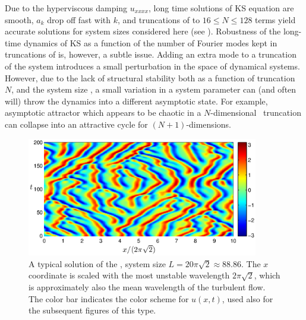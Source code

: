 Due to the hyperviscous damping $u_{xxxx}$, long time solutions of KS
equation are smooth, $a_k$ drop off fast
with $k$, and truncations of  to $16 \leq N \leq 128$
terms yield accurate solutions for system sizes considered here (see
).  Robustness of the long-time dynamics
of KS as a function of the number of Fourier modes kept in truncations
of  is, however, a subtle issue.  Adding an extra mode to
a truncation of the system introduces a small perturbation in the
space of dynamical systems.  However, due to the lack of structural
stability both as a function of truncation $N$, and the system size
, a small variation in a system parameter can (and often will)
throw the dynamics into a different asymptotic state.  For example,
asymptotic attractor which appears to be chaotic in a $N$-dimensional
\statesp\ truncation can collapse into an attractive cycle
for $(N\!+\!1)$-dimensions.

\begin{figure}[t]
\begin{center}
\includegraphics[width=0.9\textwidth]{figs/ks_largeL_cbar_200.eps} %
\end{center}
\caption{
A typical  solution of the \KSe, system size
$L=20\pi\sqrt{2}\approx 88.86$.  The $x$ coordinate is scaled
with the most unstable wavelength $2\pi\sqrt{2}$, which is
approximately also the mean wavelength of the turbulent flow.
The color bar indicates the color scheme for $u(x,t)$, used also
for the subsequent figures of this type.
     } \label{f:ks_largeL}
\end{figure}

